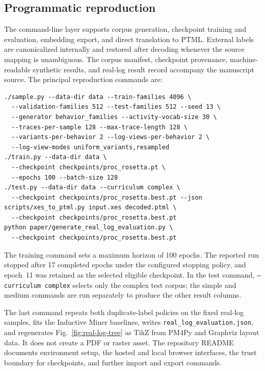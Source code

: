 \documentclass[pdflatex,sn-basic]{sn-jnl}
\begin{document}
\FloatBarrier
\subsection{Programmatic reproduction}

The command-line layer supports corpus generation, checkpoint training and evaluation, embedding export, and direct translation to PTML. External labels are canonicalized internally and restored after decoding whenever the source mapping is unambiguous. The corpus manifest, checkpoint provenance, machine-readable synthetic results, and real-log result record accompany the manuscript source. The principal reproduction commands are:

\begin{lstlisting}[basicstyle=\ttfamily\footnotesize,frame=single,breaklines=true]
./sample.py --data-dir data --train-families 4096 \
  --validation-families 512 --test-families 512 --seed 13 \
  --generator behavior_families --activity-vocab-size 30 \
  --traces-per-sample 128 --max-trace-length 128 \
  --variants-per-behavior 2 --log-views-per-behavior 2 \
  --log-view-modes uniform_variants,resampled
./train.py --data-dir data \
  --checkpoint checkpoints/proc_rosetta.pt \
  --epochs 100 --batch-size 128
./test.py --data-dir data --curriculum complex \
  --checkpoint checkpoints/proc_rosetta.best.pt --json
scripts/xes_to_ptml.py input.xes decoded.ptml \
  --checkpoint checkpoints/proc_rosetta.best.pt
python paper/generate_real_log_evaluation.py \
  --checkpoint checkpoints/proc_rosetta.best.pt
\end{lstlisting}

The training command sets a maximum horizon of 100 epochs. The reported run stopped after 17 completed epochs under the configured stopping policy, and epoch~11 was retained as the selected eligible checkpoint. In the test command, \texttt{--curriculum complex} selects only the complex test corpus; the simple and medium commands are run separately to produce the other result columns.

The last command repeats both duplicate-label policies on the fixed real-log samples, fits the Inductive Miner baselines, writes \texttt{real\_log\_evaluation.json}, and regenerates Fig.~\ref{fig:real-log-tree} as TikZ from PM4Py and Graphviz layout data. It does not create a PDF or raster asset. The repository README documents environment setup, the hosted and local browser interfaces, the trust boundary for checkpoints, and further import and export commands.
\end{document}
